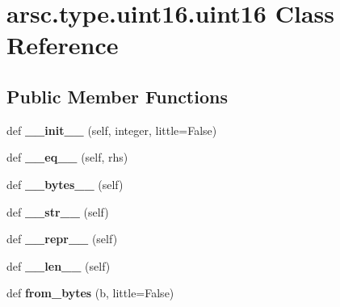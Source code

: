 \hypertarget{classarsc_1_1type_1_1uint16_1_1uint16}{}\section{arsc.\+type.\+uint16.\+uint16 Class Reference}
\label{classarsc_1_1type_1_1uint16_1_1uint16}
\subsection*{Public Member Functions}
\begin{DoxyCompactItemize}
\item 
\mbox{\label{classarsc_1_1type_1_1uint16_1_1uint16_a5db31b513f33e92b92ffa85f1336430e}} 
def {\bfseries \+\_\+\+\_\+init\+\_\+\+\_\+} (self, integer, little=False)
\item 
\mbox{\label{classarsc_1_1type_1_1uint16_1_1uint16_a96593569114d775be5f68f465cb58a07}} 
def {\bfseries \+\_\+\+\_\+eq\+\_\+\+\_\+} (self, rhs)
\item 
\mbox{\label{classarsc_1_1type_1_1uint16_1_1uint16_a8e69cd7b2df60696a666339f1c56897a}} 
def {\bfseries \+\_\+\+\_\+bytes\+\_\+\+\_\+} (self)
\item 
\mbox{\label{classarsc_1_1type_1_1uint16_1_1uint16_aa2c79524bec05e938705548019442708}} 
def {\bfseries \+\_\+\+\_\+str\+\_\+\+\_\+} (self)
\item 
\mbox{\label{classarsc_1_1type_1_1uint16_1_1uint16_a0eaeef9c41d7970c9b16853853fb2748}} 
def {\bfseries \+\_\+\+\_\+repr\+\_\+\+\_\+} (self)
\item 
\mbox{\label{classarsc_1_1type_1_1uint16_1_1uint16_aa0b1afcfb3f690a4c5d3f870b55e22fb}} 
def {\bfseries \+\_\+\+\_\+len\+\_\+\+\_\+} (self)
\item 
\mbox{\label{classarsc_1_1type_1_1uint16_1_1uint16_a70d0cad2c0e7da16b5af6ca22a5e451e}} 
def {\bfseries from\+\_\+bytes} (b, little=False)
\end{DoxyCompactItemize}
